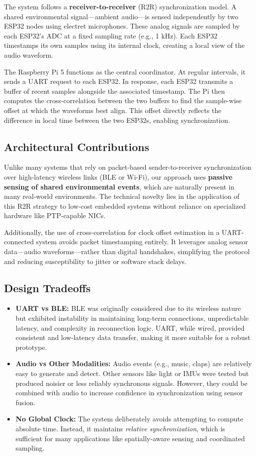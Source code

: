 \documentclass[sigconf]{acmart}
\begin{document}
The system follows a \textbf{receiver-to-receiver} (R2R) synchronization model. A shared environmental signal—ambient audio—is sensed independently by two ESP32 nodes using electret microphones. These analog signals are sampled by each ESP32’s ADC at a fixed sampling rate (e.g., 1 kHz). Each ESP32 timestamps its own samples using its internal clock, creating a local view of the audio waveform.

The Raspberry Pi 5 functions as the central coordinator. At regular intervals, it sends a UART request to each ESP32. In response, each ESP32 transmits a buffer of recent samples alongside the associated timestamp. The Pi then computes the cross-correlation between the two buffers to find the sample-wise offset at which the waveforms best align. This offset directly reflects the difference in local time between the two ESP32s, enabling synchronization.

\subsection{Architectural Contributions}
Unlike many systems that rely on packet-based sender-to-receiver synchronization over high-latency wireless links (BLE or Wi-Fi), our approach uses \textbf{passive sensing of shared environmental events}, which are naturally present in many real-world environments. The technical novelty lies in the application of this R2R strategy to low-cost embedded systems without reliance on specialized hardware like PTP-capable NICs.

Additionally, the use of cross-correlation for clock offset estimation in a UART-connected system avoids packet timestamping entirely. It leverages analog sensor data—audio waveforms—rather than digital handshakes, simplifying the protocol and reducing susceptibility to jitter or software stack delays.

\subsection{Design Tradeoffs}
\begin{itemize}
    \item \textbf{UART vs BLE:} BLE was originally considered due to its wireless nature but exhibited instability in maintaining long-term connections, unpredictable latency, and complexity in reconnection logic. UART, while wired, provided consistent and low-latency data transfer, making it more suitable for a robust prototype.
    \item \textbf{Audio vs Other Modalities:} Audio events (e.g., music, claps) are relatively easy to generate and detect. Other sensors like light or IMUs were tested but produced noisier or less reliably synchronous signals. However, they could be combined with audio to increase confidence in synchronization using sensor fusion.
    \item \textbf{No Global Clock:} The system deliberately avoids attempting to compute absolute time. Instead, it maintains \textit{relative synchronization}, which is sufficient for many applications like spatially-aware sensing and coordinated sampling.
\end{itemize}
\end{document}
